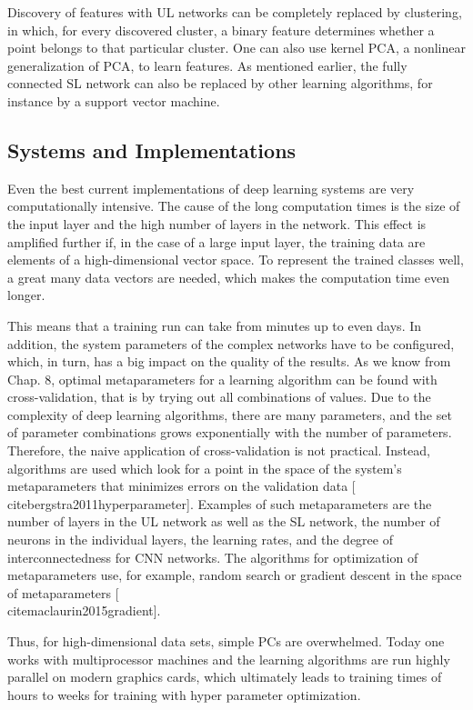 \documentclass[10pt]{book}
\begin{document}
Discovery of features with UL networks can be completely replaced by clustering, in which, for every discovered cluster, a binary feature determines whether a point belongs to that particular cluster. One can also use kernel PCA, a nonlinear generalization of PCA, to learn features. As mentioned earlier, the fully connected SL network can also be replaced by other learning algorithms, for instance by a support vector machine.

\subsection{Systems and Implementations}
Even the best current implementations of deep learning systems are very computationally intensive. The cause of the long computation times is the size of the input layer and the high number of layers in the network. This effect is amplified further if, in the case of a large input layer, the training data are elements of a high-dimensional vector space. To represent the trained classes well, a great many data vectors are needed, which makes the computation time even longer.


This means that a training run can take from minutes up to even days. In addition, the system parameters of the complex networks have to be configured, which, in turn, has a big impact on the quality of the results. As we know from Chap. 8, optimal metaparameters for a learning algorithm can be found with cross-validation, that is by trying out all combinations of values. Due to the complexity of deep learning algorithms, there are many parameters, and the set of parameter combinations grows exponentially with the number of parameters. Therefore, the naive application of cross-validation is not practical. Instead, algorithms are used which look for a point in the space of the system's metaparameters that minimizes errors on the validation data [\\cite{bergstra2011hyperparameter}]. Examples of such metaparameters are the number of layers in the UL network as well as the SL network, the number of neurons in the individual layers, the learning rates, and the degree of interconnectedness for CNN networks. The algorithms for optimization of metaparameters use, for example, random search or gradient descent in the space of metaparameters [\\cite{maclaurin2015gradient}].

Thus, for high-dimensional data sets, simple PCs are overwhelmed. Today one works with multiprocessor machines and the learning algorithms are run highly parallel on modern graphics cards, which ultimately leads to training times of hours to weeks for training with hyper parameter optimization.
\end{document}
